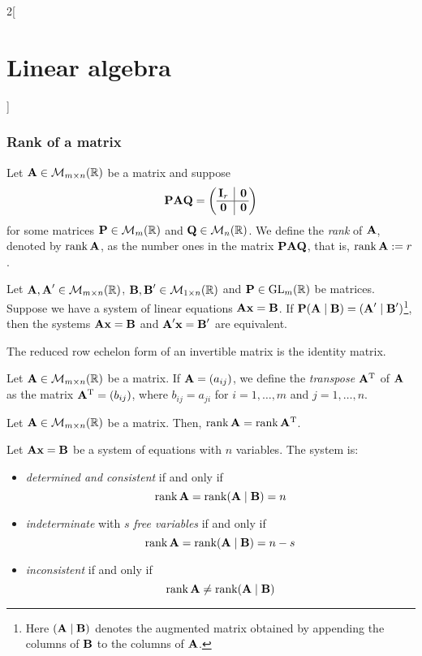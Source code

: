 \documentclass[../../../main.tex]{subfiles}
\begin{document}
\begin{multicols}{2}[\section{Linear algebra}]
  \subsubsection{Rank of a matrix}
  \begin{definition}[Rank]
    Let $\boldsymbol{\mathrm{A}}\in\mathcal{M}_{m\times n}(\mathbb{R})$ be a matrix and suppose
    $$\vf{P}\vf{A}\vf{Q}=\left(
      \begin{array}{@{\,} c|c @{\,}}
          \vf{I}_r & \vf{0} \\
          \hline
          \vf{0}   & \vf{0}
        \end{array}
      \right)$$ for some matrices $\boldsymbol{\mathrm{P}}\in\mathcal{M}_m(\mathbb{R})$ and $\boldsymbol{\mathrm{Q}}\in\mathcal{M}_n(\mathbb{R})$. We define the \emph{rank} of $\boldsymbol{\mathrm{A}}$, denoted by $\rank \boldsymbol{\mathrm{A}}$, as the number ones in the matrix $\boldsymbol{\mathrm{P}}\boldsymbol{\mathrm{A}}\boldsymbol{\mathrm{Q}}$, that is, $\rank\boldsymbol{\mathrm{A}}:=r$.
  \end{definition}
  \begin{proposition}
    Let $\boldsymbol{\mathrm{A}},\boldsymbol{\mathrm{A}}'\in\mathcal{M}_{m\times n}(\mathbb{R})$, $\boldsymbol{\mathrm{B}},\boldsymbol{\mathrm{B}}'\in\mathcal{M}_{1\times n}(\mathbb{R})$ and $\boldsymbol{\mathrm{P}}\in\mathrm{GL}_m(\mathbb{R})$ be matrices. Suppose we have a system of linear equations $\boldsymbol{\mathrm{A}}\boldsymbol{\mathrm{x}}=\boldsymbol{\mathrm{B}}$. If $\boldsymbol{\mathrm{P}}(\boldsymbol{\mathrm{A}}\mid\boldsymbol{\mathrm{B}})=(\boldsymbol{\mathrm{A}}'\mid\boldsymbol{\mathrm{B}}')$\footnote{Here $(\boldsymbol{\mathrm{A}}\mid\boldsymbol{\mathrm{B}})$ denotes the augmented matrix obtained by appending the columns of $\boldsymbol{\mathrm{B}}$ to the columns of $\boldsymbol{\mathrm{A}}$.}, then the systems $\boldsymbol{\mathrm{A}}\boldsymbol{\mathrm{x}}=\boldsymbol{\mathrm{B}}$ and $\boldsymbol{\mathrm{A}}'\boldsymbol{\mathrm{x}}=\boldsymbol{\mathrm{B}}'$ are equivalent.
  \end{proposition}
  \begin{corollary}
    The reduced row echelon form of an invertible matrix is the identity matrix.
  \end{corollary}
  \begin{definition}[Transposition]
    Let $\boldsymbol{\mathrm{A}}\in\mathcal{M}_{m\times n}(\mathbb{R})$ be a matrix. If $\boldsymbol{\mathrm{A}}=(a_{ij})$, we define the \emph{transpose} $\vb{A}^{\mathrm{T}}$ of $\boldsymbol{\mathrm{A}}$ as the matrix $\vb{A}^{\mathrm{T}}=(b_{ij})$, where $b_{ij}=a_{ji}$ for $i=1,\ldots,m$ and $j=1,\ldots,n$.
  \end{definition}
  \begin{proposition}
    Let $\boldsymbol{\mathrm{A}}\in\mathcal{M}_{m\times n}(\mathbb{R})$ be a matrix. Then, $\rank \boldsymbol{\mathrm{A}}=\rank\vb{A}^{\mathrm{T}}$.
  \end{proposition}
  \begin{theorem}
    Let $\boldsymbol{\mathrm{A}}\boldsymbol{\mathrm{x}}=\boldsymbol{\mathrm{B}}$ be a system of equations with $n$ variables. The system is:
    \begin{itemize}
      \item \emph{determined and consistent} if and only if $$\rank \boldsymbol{\mathrm{A}}=\rank (\boldsymbol{\mathrm{A}}\mid \boldsymbol{\mathrm{B}})=n$$
      \item \emph{indeterminate} with $s$ \emph{free variables} if and only if $$\rank \boldsymbol{\mathrm{A}}=\rank (\boldsymbol{\mathrm{A}}\mid \boldsymbol{\mathrm{B}})=n-s$$
      \item \emph{inconsistent} if and only if $$\rank \boldsymbol{\mathrm{A}}\ne\rank (\boldsymbol{\mathrm{A}}\mid \boldsymbol{\mathrm{B}})$$
    \end{itemize}
  \end{theorem}

\end{multicols}
\end{document}
